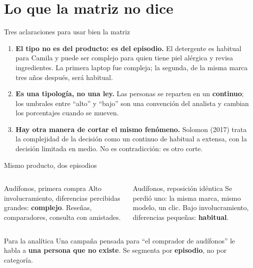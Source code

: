 \documentclass[aspectratio=169,xcolor=dvipsnames]{beamer}
\begin{document}
\section[Matices]{Lo que la matriz no dice}

\begin{frame}{Tres aclaraciones para usar bien la matriz}
\begin{enumerate}
  \small
  \item \textbf{El tipo no es del producto: es del episodio.} El detergente es habitual para Camila y puede ser complejo para quien tiene piel alérgica y revisa ingredientes. La primera laptop fue compleja; la segunda, de la misma marca tres años después, será habitual.
  \vspace{3pt}
  \item \textbf{Es una tipología, no una ley.} Las personas se reparten en un \textbf{continuo}; los umbrales entre \enquote{alto} y \enquote{bajo} son una convención del analista y cambian los porcentajes cuando se mueven.
  \vspace{3pt}
  \item \textbf{Hay otra manera de cortar el mismo fenómeno.} Solomon (2017) trata la complejidad de la decisión como un continuo de habitual a extensa, con la decisión limitada en medio. No es contradicción: es otro corte.
\end{enumerate}
\end{frame}

\begin{frame}{Mismo producto, dos episodios}
\begin{columns}[T]
  \begin{block}{Audífonos, primera compra}
    \small Alto involucramiento, diferencias percibidas grandes: \textbf{complejo}. Reseñas, comparadores, consulta con amistades.
  \end{block}
  \begin{exampleblock}{Audífonos, reposición idéntica}
    \small Se perdió uno: la misma marca, mismo modelo, un clic. Bajo involucramiento, diferencias pequeñas: \textbf{habitual}.
  \end{exampleblock}
\end{columns}
\vspace{6pt}
\begin{alertblock}{Para la analítica}
  \small Una campaña pensada para \enquote{el comprador de audífonos} le habla a \textbf{una persona que no existe}. Se segmenta por \textbf{episodio}, no por categoría.
\end{alertblock}
\end{frame}
\end{document}

